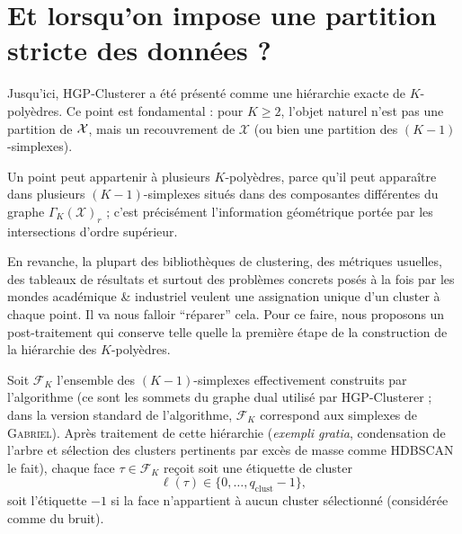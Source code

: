 
\section{Et lorsqu'on impose une partition stricte des données ?}
\label{sec:chapV_partition_stricte}

Jusqu'ici, HGP-Clusterer a été présenté comme une hiérarchie exacte de $K$-polyèdres. Ce point est fondamental : pour $K\ge2$, l'objet naturel n'est pas une partition de $\mathcal{X}$, mais un recouvrement de $\mathcal X$ (ou bien une partition des $(K-1)$-simplexes). 

Un point peut appartenir à plusieurs $K$-polyèdres, parce qu'il peut apparaître dans plusieurs $(K-1)$-simplexes situés dans des composantes différentes du graphe $\Gamma_K(\mathcal X)_r$ ; c'est précisément l'information géométrique portée par les intersections d'ordre supérieur.

En revanche, la plupart des bibliothèques de clustering, des métriques usuelles, des tableaux de résultats et surtout des problèmes concrets posés à la fois par les mondes académique \& industriel veulent une assignation unique d'un cluster à chaque point. 
Il va nous falloir ``réparer'' cela. Pour ce faire, nous proposons un post-traitement qui conserve telle quelle la première étape de la construction de la hiérarchie des $K$-polyèdres.

Soit $\mathcal F_K$ l'ensemble des $(K-1)$-simplexes effectivement construits par l'algorithme (ce sont les sommets du graphe dual utilisé par HGP-Clusterer ; dans la version standard de l'algorithme, $\mathcal F_K$ correspond aux simplexes de \textsc{Gabriel}). 
Après traitement de cette hiérarchie (\emph{exempli gratia}, condensation de l'arbre et sélection des clusters pertinents par excès de masse comme HDBSCAN \cite{HDBSCAN2017} le fait), chaque face $\tau\in\mathcal F_K$ reçoit soit une étiquette de cluster
\[
    \ell(\tau)\in \{0,\ldots, q_\mathrm{clust}-1\},
\]
soit l'étiquette $-1$ si la face n'appartient à aucun cluster sélectionné (considérée comme du bruit).

